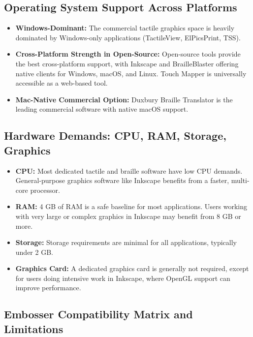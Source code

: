 \subsection{Operating System Support Across Platforms}\label{ch14:ssec:os-support}
\begin{itemize}
	\item \textbf{Windows-Dominant:} The commercial tactile graphics space is heavily dominated by Windows-only applications (TactileView, ElPicsPrint, TSS).
	\item \textbf{Cross-Platform Strength in Open-Source:} Open-source tools provide the best cross-platform support, with Inkscape and BrailleBlaster offering native clients for Windows, macOS, and Linux. Touch Mapper is universally accessible as a web-based tool.
	\item \textbf{Mac-Native Commercial Option:} Duxbury Braille Translator is the leading commercial software with native macOS support.
\end{itemize}

\subsection{Hardware Demands: CPU, RAM, Storage, Graphics}\label{ch14:ssec:hardware-demands}
\begin{itemize}
	\item \textbf{CPU:} Most dedicated tactile and braille software have low CPU demands. General-purpose graphics software like Inkscape benefits from a faster, multi-core processor.
	\item \textbf{RAM:} 4 GB of RAM is a safe baseline for most applications. Users working with very large or complex graphics in Inkscape may benefit from 8 GB or more.
	\item \textbf{Storage:} Storage requirements are minimal for all applications, typically under 2 GB.
	\item \textbf{Graphics Card:} A dedicated graphics card is generally not required, except for users doing intensive work in Inkscape, where OpenGL support can improve performance.
\end{itemize}

\subsection{Embosser Compatibility Matrix and Limitations}\label{ch14:ssec:embosser-matrix}

